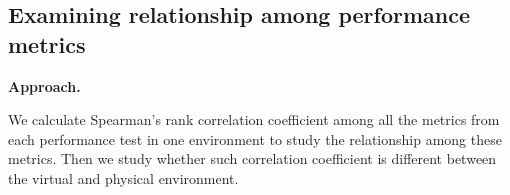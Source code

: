 \subsection{Examining relationship among performance metrics}






\noindent \textbf{Approach.} 

We calculate Spearman's rank correlation coefficient among all the metrics from each performance test in one environment to study the relationship among these metrics. Then we study whether such correlation coefficient is different between the virtual and physical environment. 

